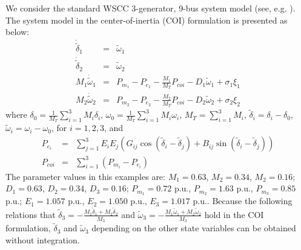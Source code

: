 \documentclass[journal]{IEEEtran}
\begin{document}
We consider the standard WSCC 3-generator, 9-bus system model (see, e.g. \cite{Chiang:book}). The system model in the center-of-inertia (COI) formulation is presented as below:
\begin{eqnarray}
\dot{\tilde{\delta}}_1&=&\tilde{\omega}_1\label{9bus-1}\\
\dot{\tilde{\delta}}_2&=&\tilde{\omega}_2\\
M_1\dot{\tilde{\omega}}_1&=&P_{m_1}-P_{e_1}-\frac{M_1}{M_T}P_{coi}-D_1\tilde{\omega}_1+\sigma_1\xi_1\\
M_2\dot{\tilde{\omega}}_2&=&P_{m_2}-P_{e_2}-\frac{M_2}{M_T}P_{coi}-D_2\tilde{\omega}_2+\sigma_2\xi_2\label{9bus-2}
\end{eqnarray}
where $\delta_0=\frac{1}{M_T}\sum_{i=1}^{3}M_i\delta_i$, $\omega_0=\frac{1}{M_T}\sum_{i=1}^{3}M_i\omega_i$, $M_T=\sum_{i=1}^{3}M_i$, $\tilde{\delta}_i=\delta_i-\delta_0$, $\tilde{\omega}_i=\omega_i-\omega_0$, for $i=1,2,3$,
and
\begin{eqnarray}
P_{e_i}&=&\sum_{j=1}^{3}E_iE_j(G_{ij}\cos(\tilde{\delta}_i-\tilde{\delta}_j)+B_{ij}\sin(\tilde{\delta}_i-\tilde{\delta}_j))\nonumber\\
P_{coi}&=&\sum_{i=1}^{3}(P_{m_i}-P_{e_i})
\end{eqnarray}
The parameter values in this examples are: $M_1=0.63$, $M_2=0.34$, $M_2=0.16$; $D_1=0.63$, $D_2=0.34$, $D_3=0.16$; $P_{m_1}=0.72$ p.u., $P_{m_2}=1.63$ p.u., $P_{m_3}=0.85$ p.u.; $E_1=1.057$ p.u., $E_2=1.050$ p.u., $E_3=1.017$ p.u..
Because the following relations that $\tilde{\delta}_3=-\frac{M_1\tilde{\delta}_1+M_2\tilde{\delta}_2}{M_3}$ and $\tilde{\omega}_3=-\frac{M_1\tilde{\omega}_1+M_2\tilde{\omega}_2}{M_3}$ hold in the COI formulation, $\tilde{\delta}_3$ and $\tilde{\omega}_3$ depending on the other state variables can be obtained without integration.
\end{document}
